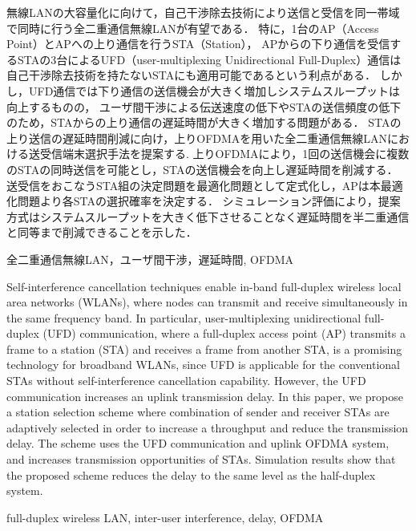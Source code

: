 \documentclass[technicalreport]{ieicej}
\begin{document}
\begin{jabstract}
	無線LANの大容量化に向けて，自己干渉除去技術により送信と受信を同一帯域で同時に行う全二重通信無線LANが有望である．
	特に，1台のAP（Access Point）とAPへの上り通信を行うSTA（Station），
	APからの下り通信を受信するSTAの3台によるUFD（user-multiplexing Unidirectional Full-Duplex）通信は自己干渉除去技術を持たないSTAにも適用可能であるという利点がある．
	しかし，UFD通信では下り通信の送信機会が大きく増加しシステムスループットは向上するものの，
	ユーザ間干渉による伝送速度の低下やSTAの送信頻度の低下のため，STAからの上り通信の遅延時間が大きく増加する問題がある．
	STAの上り送信の遅延時間削減に向け，上りOFDMAを用いた全二重通信無線LANにおける送受信端末選択手法を提案する.
	上りOFDMAにより，1回の送信機会に複数のSTAの同時送信を可能とし，STAの送信機会を向上し遅延時間を削減する．
	送受信をおこなうSTA組の決定問題を最適化問題として定式化し，APは本最適化問題より各STAの選択確率を決定する．
	シミュレーション評価により，提案方式はシステムスループットを大きく低下させることなく遅延時間を半二重通信と同等まで削減できることを示した．
\end{jabstract}
\begin{jkeyword}
	全二重通信無線LAN，ユーザ間干渉，遅延時間, OFDMA
\end{jkeyword}
\begin{eabstract}
	Self-interference cancellation techniques enable in-band full-duplex wireless local area networks (WLANs), where nodes can  transmit and receive simultaneously in the same frequency band.
	In particular, user-multiplexing unidirectional full-duplex (UFD) communication, where a full-duplex access point (AP) transmits a frame to a station (STA) and receives a frame from another STA, is a promising technology for broadband WLANs, since UFD is applicable for the conventional STAs without self-interference cancellation capability.
	However, the UFD communication increases an uplink transmission delay.
	In this paper, we propose a station selection scheme where combination of sender and receiver STAs are adaptively selected in order to increase a throughput and reduce the transmission delay.
	The scheme uses the UFD communication and uplink OFDMA system, and increases transmission opportunities of STAs.
	Simulation results show that the proposed scheme reduces the delay to the same level as the half-duplex system.

\end{eabstract}
\begin{ekeyword}
	full-duplex wireless LAN, inter-user interference, delay, OFDMA
\end{ekeyword}
\end{document}
